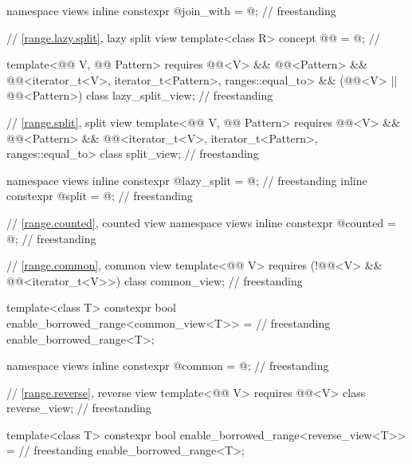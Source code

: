 \begin{codeblock}
{  namespace views { inline constexpr @\unspecnc@ join_with = @\unspecnc@; }         // freestanding

  // \ref{range.lazy.split}, lazy split view
  template<class R>
    concept @@ = @\seebelow@;   // \expos

  template<@@ V, @@ Pattern>
    requires @@<V> && @@<Pattern> &&
             @@<iterator_t<V>, iterator_t<Pattern>, ranges::equal_to> &&
             (@@<V> || @@<Pattern>)
  class lazy_split_view;                                                            // freestanding

  // \ref{range.split}, split view
 template<@@ V, @@ Pattern>
   requires @@<V> && @@<Pattern> &&
            @@<iterator_t<V>, iterator_t<Pattern>, ranges::equal_to>
  class split_view;                                                                 // freestanding

  namespace views {
    inline constexpr @\unspecnc@ lazy_split = @\unspecnc@;                          // freestanding
    inline constexpr @\unspecnc@ split = @\unspecnc@;                               // freestanding
  }

  // \ref{range.counted}, counted view
  namespace views { inline constexpr @\unspecnc@ counted = @\unspecnc@; }           // freestanding

  // \ref{range.common}, common view
  template<@@ V>
    requires (!@@<V> && @@<iterator_t<V>>)
  class common_view;                                                                // freestanding

  template<class T>
    constexpr bool enable_borrowed_range<common_view<T>> =                          // freestanding
      enable_borrowed_range<T>;

  namespace views { inline constexpr @\unspecnc@ common = @\unspecnc@; }            // freestanding

  // \ref{range.reverse}, reverse view
  template<@@ V>
    requires @@<V>
  class reverse_view;                                                               // freestanding

  template<class T>
    constexpr bool enable_borrowed_range<reverse_view<T>> =                         // freestanding
      enable_borrowed_range<T>;

}
\end{codeblock}
